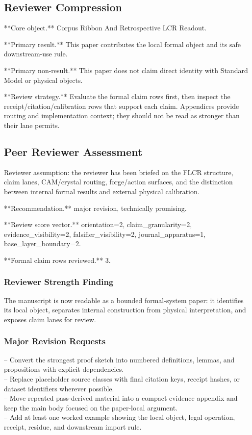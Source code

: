 \documentclass[11pt]{article}
\begin{document}
\subsection*{Reviewer Compression}

**Core object.** Corpus Ribbon And Retrospective LCR Readout.

**Primary result.** This paper contributes the local formal object and its safe downstream-use rule.

**Primary non-result.** This paper does not claim direct identity with Standard Model or physical objects.

**Review strategy.** Evaluate the formal claim rows first, then inspect the receipt/citation/calibration rows that support each claim. Appendices provide routing and implementation context; they should not be read as stronger than their lane permits.

\subsection*{Peer Reviewer Assessment}

Reviewer assumption: the reviewer has been briefed on the FLCR structure, claim lanes, CAM/crystal routing, forge/action surfaces, and the distinction between internal formal results and external physical calibration.

**Recommendation.** major revision, technically promising.

**Review score vector.** orientation=2, claim\_granularity=2, evidence\_visibility=2, falsifier\_visibility=2, journal\_apparatus=1, base\_layer\_boundary=2.

**Formal claim rows reviewed.** 3.

\subsubsection*{Reviewer Strength Finding}

The manuscript is now readable as a bounded formal-system paper: it identifies its local object, separates internal construction from physical interpretation, and exposes claim lanes for review.

\subsubsection*{Major Revision Requests}

\noindent{}-- Convert the strongest proof sketch into numbered definitions, lemmas, and propositions with explicit dependencies.\\
\noindent{}-- Replace placeholder source classes with final citation keys, receipt hashes, or dataset identifiers wherever possible.\\
\noindent{}-- Move repeated pass-derived material into a compact evidence appendix and keep the main body focused on the paper-local argument.\\
\noindent{}-- Add at least one worked example showing the local object, legal operation, receipt, residue, and downstream import rule.\\
\end{document}
